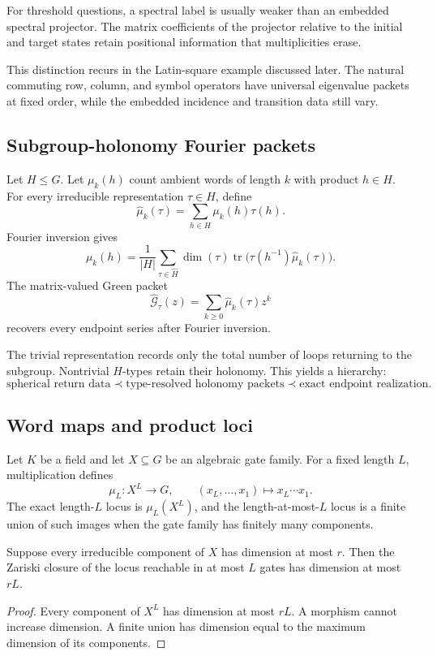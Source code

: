 \begin{principle}
For threshold questions, a spectral label is usually weaker than an embedded spectral projector.  The matrix coefficients of the projector relative to the initial and target states retain positional information that multiplicities erase.
\end{principle}

This distinction recurs in the Latin-square example discussed later.  The natural commuting row, column, and symbol operators have universal eigenvalue packets at fixed order, while the embedded incidence and transition data still vary.

\subsection{Subgroup-holonomy Fourier packets}
Let $H\le G$.  Let $\mu_k(h)$ count ambient words of length $k$ with product $h\in H$.  For every irreducible representation $\tau\in\widehat H$, define
\[
\widehat\mu_k(\tau)
=
\sum_{h\in H}\mu_k(h)\tau(h).
\]
Fourier inversion gives
\[
\mu_k(h)
=
\frac1{|H|}
\sum_{\tau\in\widehat H}
\dim(\tau)
\operatorname{tr}
\bigl(
\tau(h^{-1})\widehat\mu_k(\tau)
\bigr).
\]
The matrix-valued Green packet
\[
\widehat{\mathcal G}_\tau(z)
=
\sum_{k\ge0}\widehat\mu_k(\tau)z^k
\]
recovers every endpoint series after Fourier inversion.

The trivial representation records only the total number of loops returning to the subgroup.  Nontrivial $H$-types retain their holonomy.  This yields a hierarchy:
\[
\text{spherical return data}
\prec
\text{type-resolved holonomy packets}
\prec
\text{exact endpoint realization}.
\]

\subsection{Word maps and product loci}
Let $K$ be a field and let $X\subseteq G$ be an algebraic gate family.  For a fixed length $L$, multiplication defines
\[
\mu_L:X^L\to G,
\qquad
(x_L,\ldots,x_1)\mapsto x_L\cdots x_1.
\]
The exact length-$L$ locus is $\mu_L(X^L)$, and the length-at-most-$L$ locus is a finite union of such images when the gate family has finitely many components.

\begin{theorem}
Suppose every irreducible component of $X$ has dimension at most $r$.  Then the Zariski closure of the locus reachable in at most $L$ gates has dimension at most $rL$.
\end{theorem}
\begin{proof}
Every component of $X^L$ has dimension at most $rL$.  A morphism cannot increase dimension.  A finite union has dimension equal to the maximum dimension of its components.
\end{proof}

